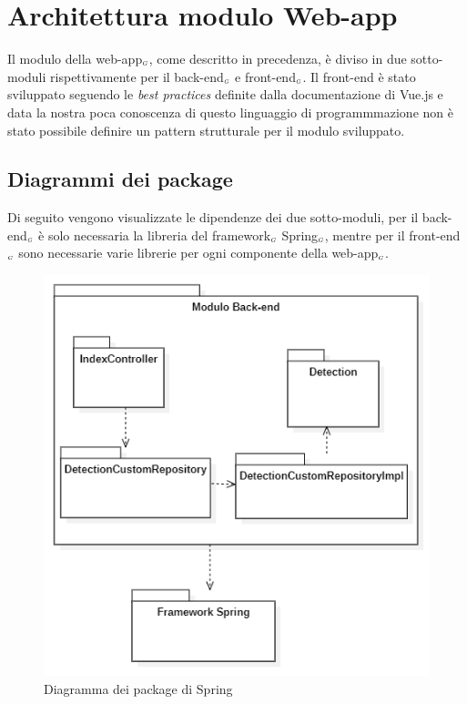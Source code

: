 \section{Architettura modulo Web-app}\label{ArchitetturaModuloWebApp}
Il modulo della web-app$_{\scaleto{G}{3pt}}$, come descritto in precedenza, è diviso in due sotto-moduli rispettivamente per il back-end$_{\scaleto{G}{3pt}}$ e front-end$_{\scaleto{G}{3pt}}$.
Il front-end è stato sviluppato seguendo le \textit{best practices} definite dalla documentazione di Vue.js e data la nostra poca conoscenza di questo linguaggio di programmmazione non è stato possibile definire un pattern strutturale per il modulo sviluppato. 
\subsection{Diagrammi dei package}\label{ArchitetturaModuloWebAppDiagrammiDeiPackage}
Di seguito vengono visualizzate le dipendenze dei due sotto-moduli, per il back-end$_{\scaleto{G}{3pt}}$ è solo necessaria la libreria del framework$_{\scaleto{G}{3pt}}$ Spring$_{\scaleto{G}{3pt}}$, mentre per il front-end$_{\scaleto{G}{3pt}}$ sono necessarie varie librerie per ogni componente della web-app$_{\scaleto{G}{3pt}}$.
\begin{figure}[H]
  \begin{center}
    \includegraphics[scale=0.8]{../immagini/diag_PB/diag_pack_spring.png}
    \caption{Diagramma dei package di Spring}
  \end{center}
\end{figure}

